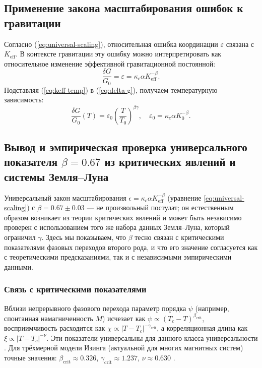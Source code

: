 \documentclass[12pt]{article}
\theoremstyle{remark}
\newcommand{\Keff}{K_{\mathrm{eff}}}
\newcommand{\eps}{\varepsilon}
\newcommand{\kappac}{\kappa_c}
\begin{document}
	\subsection{Применение закона масштабирования ошибок к гравитации}
	\label{subsec:error-gravity}
	
	Согласно (\ref{eq:universal-scaling}), относительная ошибка координации $\eps$ связана с $\Keff$. В контексте гравитации эту ошибку можно интерпретировать как относительное изменение эффективной гравитационной постоянной:
	\begin{equation}
		\frac{\delta G}{G_0} = \eps = \kappac \alpha \Keff^{-\beta}.
		\label{eq:delta-g}
	\end{equation}
	Подставляя (\ref{eq:keff-temp}) в (\ref{eq:delta-g}), получаем температурную зависимость:
	\begin{equation}
		\frac{\delta G}{G_0}(T) = \eps_0 \left( \frac{T}{T_0} \right)^{\beta\gamma}, \quad \eps_0 = \kappac \alpha K_0^{-\beta}.
		\label{eq:g-temp}
	\end{equation}
	
	\subsection{Вывод и эмпирическая проверка универсального показателя \(\beta = 0.67\) из критических явлений и системы Земля–Луна}
	\label{subsec:beta-empirical}
	
	Универсальный закон масштабирования $\epsilon = \kappa_c \alpha K_{\mathrm{eff}}^{-\beta}$ (уравнение \ref{eq:universal-scaling}) с $\beta = 0.67 \pm 0.03$ — не произвольный постулат; он естественным образом возникает из теории критических явлений и может быть независимо проверен с использованием того же набора данных Земля–Луна, который ограничил $\gamma$. Здесь мы показываем, что $\beta$ тесно связан с критическими показателями фазовых переходов второго рода, и что его значение согласуется как с теоретическими предсказаниями, так и с независимыми эмпирическими данными.
	
	\subsubsection{Связь с критическими показателями}
	Вблизи непрерывного фазового перехода параметр порядка $\psi$ (например, спонтанная намагниченность $M$) исчезает как $\psi \propto (T_c - T)^{\beta_{\mathrm{crit}}}$, восприимчивость расходится как $\chi \propto |T - T_c|^{-\gamma_{\mathrm{crit}}}$, а корреляционная длина как $\xi \propto |T - T_c|^{-\nu}$. Эти показатели универсальны для данного класса универсальности \cite{Wilson1974, Fisher1974}. Для трёхмерной модели Изинга (актуальной для многих магнитных систем) точные значения: $\beta_{\mathrm{crit}} \approx 0.326$, $\gamma_{\mathrm{crit}} \approx 1.237$, $\nu \approx 0.630$ \cite{El-Showk2014}.
	
\end{document}
